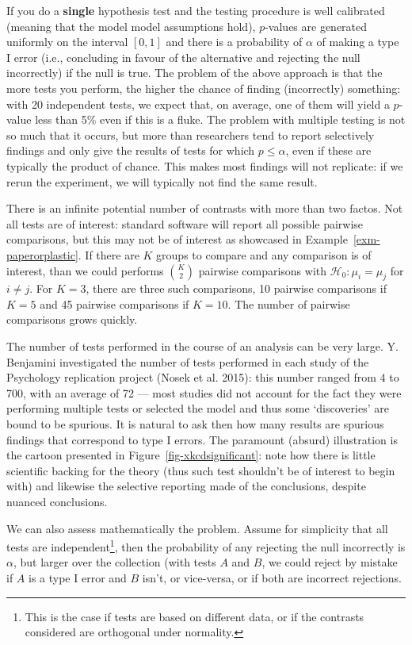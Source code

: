 \documentclass[
  11pt,
  letterpaper,
]{scrbook}
\theoremstyle{definition}
\theoremstyle{definition}
\theoremstyle{remark}
\begin{document}
If you do a \textbf{single} hypothesis test and the testing procedure is
well calibrated (meaning that the model model assumptions hold),
\(p\)-values are generated uniformly on the interval \([0,1]\) and there
is a probability of \(\alpha\) of making a type I error (i.e.,
concluding in favour of the alternative and rejecting the null
incorrectly) if the null is true. The problem of the above approach is
that the more tests you perform, the higher the chance of finding
(incorrectly) something: with 20 independent tests, we expect that, on
average, one of them will yield a \(p\)-value less than 5\% even if this
is a fluke. The problem with multiple testing is not so much that it
occurs, but more than researchers tend to report selectively findings
and only give the results of tests for which \(p \leq \alpha\), even if
these are typically the product of chance. This makes most findings will
not replicate: if we rerun the experiment, we will typically not find
the same result.

There is an infinite potential number of contrasts with more than two
factos. Not all tests are of interest: standard software will report all
possible pairwise comparisons, but this may not be of interest as
showcased in Example~\ref{exm-paperorplastic}. If there are \(K\) groups
to compare and any comparison is of interest, than we could performs
\(\binom{K}{2}\) pairwise comparisons with
\(\mathscr{H}_{0}: \mu_i = \mu_j\) for \(i \neq j\). For \(K=3\), there
are three such comparisons, 10 pairwise comparisons if \(K=5\) and 45
pairwise comparisons if \(K=10\). The number of pairwise comparisons
grows quickly.

The number of tests performed in the course of an analysis can be very
large. Y. Benjamini investigated the number of tests performed in each
study of the Psychology replication project (Nosek et al. 2015): this
number ranged from 4 to 700, with an average of 72 --- most studies did
not account for the fact they were performing multiple tests or selected
the model and thus some `discoveries' are bound to be spurious. It is
natural to ask then how many results are spurious findings that
correspond to type I errors. The paramount (absurd) illustration is the
cartoon presented in Figure~\ref{fig-xkcdsignificant}: note how there is
little scientific backing for the theory (thus such test shouldn't be of
interest to begin with) and likewise the selective reporting made of the
conclusions, despite nuanced conclusions.

We can also assess mathematically the problem. Assume for simplicity
that all tests are independent\footnote{This is the case if tests are
  based on different data, or if the contrasts considered are orthogonal
  under normality.}, then the probability of any rejecting the null
incorrectly is \(\alpha\), but larger over the collection (with tests
\(A\) and \(B\), we could reject by mistake if \(A\) is a type I error
and \(B\) isn't, or vice-versa, or if both are incorrect rejections.
\end{document}
